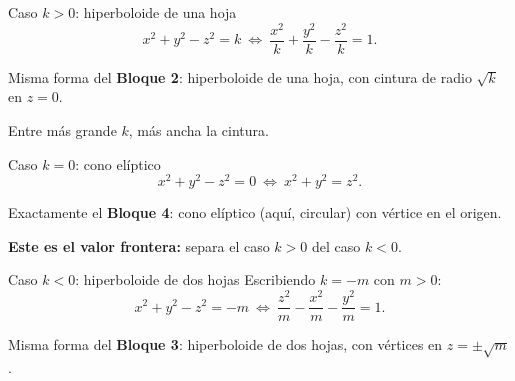 \documentclass[11pt,aspectratio=169]{beamer}
\begin{document}
\begin{frame}{Caso $k>0$: hiperboloide de una hoja}
  \[
    x^2+y^2-z^2=k \ \Longleftrightarrow\ \frac{x^2}{k}+\frac{y^2}{k}-\frac{z^2}{k}=1.
  \]
  \pause
  \begin{center}\normalsize\color{tealx}
  Misma forma del \textbf{Bloque 2}: hiperboloide de una hoja, con cintura de radio $\sqrt{k}$ en $z=0$.
  \end{center}
  \pause
  \begin{center}\small\color{gray60}
  Entre más grande $k$, más ancha la cintura.
  \end{center}
\end{frame}

\begin{frame}{Caso $k=0$: cono elíptico}
  \[
    x^2+y^2-z^2=0 \ \Longleftrightarrow\ x^2+y^2=z^2.
  \]
  \pause
  \begin{center}\normalsize\color{tealx}
  Exactamente el \textbf{Bloque 4}: cono elíptico (aquí, circular) con vértice en el origen.
  \end{center}
  \pause
  \begin{center}\normalsize\color{brick}
  \textbf{Este es el valor frontera:} separa el caso $k>0$ del caso $k<0$.
  \end{center}
\end{frame}

\begin{frame}{Caso $k<0$: hiperboloide de dos hojas}
  Escribiendo $k=-m$ con $m>0$:
  \[
    x^2+y^2-z^2=-m \ \Longleftrightarrow\ \frac{z^2}{m}-\frac{x^2}{m}-\frac{y^2}{m}=1.
  \]
  \pause
  \begin{center}\normalsize\color{tealx}
  Misma forma del \textbf{Bloque 3}: hiperboloide de dos hojas, con vértices en $z=\pm\sqrt{m}$.
  \end{center}
\end{frame}
\end{document}
